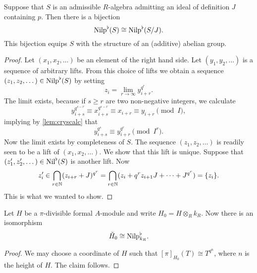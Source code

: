 \begin{lem} \label{lem:crysnilp}
  Suppose that $S$ is an admissible $R$-algebra admitting an ideal of
  definition $J$ containing $p$. Then there is a bijection
  \begin{equation*}
    {\mathrm{Nilp}}^\flat(S) \cong {\mathrm{Nilp}}^\flat(S/J).
  \end{equation*}
  This bijection equips $S$ with the structure of an (additive) abelian group. 
  \begin{proof}[Proof]
    Let $(x_1, x_2, \dots)$ be an element of the right hand side. Let
    $(y_1, y_2, \dots)$ is a sequence of arbitrary lifts. From this choice of lifts
    we obtain a sequence
    $(z_1, z_2, \dots) \in {\mathrm{Nilp}}^\flat(S)$ by setting
    \begin{equation*}
      z_i = \lim_{r \to \infty} y_{i+r}^{q^r}.
    \end{equation*}
    The limit exists, because if $s \geq r$ are two non-negative integers, we calculate
    \begin{equation*}
      y_{i + s}^{q^{s-r}} \equiv x_{i+s}^{q^{s-r}} \equiv x_{i+r} \equiv y_{i+r} \pmod I,
    \end{equation*}
    implying by \ref{lem:cryscalc} that 
    \begin{equation*}
      y_{i+s}^{q^s} \equiv y_{i+r}^{q^r} \pmod {I^r}.
    \end{equation*}
    Now the limit exists by completeness of $S$.
    The sequence $(z_1, z_2, \dots)$  is readily seen to be a lift of 
    $(x_1, x_2, \dots)$. We show that this lift is unique. Suppose that 
    $(z'_1, z'_2, \dots) \in {\operatorname{Nil}}^\flat(S)$ is another lift. Now 
    \begin{equation*}
      z'_i \in \bigcap_{r \in \mathbb{N}}(z_{i+r} + J)^{q^r} = \bigcap_{r \in \mathbb{N}}(z_{i} +
      q^r z_{i+1} J + \dots + J^{q^r})=  \{z_i\}.
    \end{equation*}
    This is what we wanted to show.
  \end{proof}
\end{lem}

\begin{lem}
  Let $H$ be a $\pi$-divisible formal $A$-module and write $H_0 = H \otimes_R k_R$. 
  Now there is an isomorphism 
  \begin{equation*}
    \tilde H_0 \cong {\mathrm{Nilp}}^\flat_{k_R}.
  \end{equation*}
\begin{proof}
  We may choose a coordinate of $H$ such that $[\pi]_{H_0}(T) \cong T^{q^n}$, where
  $n$ is the height of $H$. The claim follows. 
\end{proof}
\end{lem}

